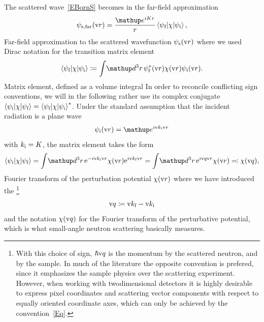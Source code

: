 The scattered wave~\cref{EBornS}
becomes in the far-field approximation
\begin{equation}\label{EsandwichC}
  \psi_\text{s,far}(\r)
  = \frac{\e^{iKr}}{r}
    \bra \psi_\tf|\chi|\psi_\ti\ket,
\end{equation}
  {Far-field approximation to the scattered wavefunction $\psi_\text{s}(\text{v}{r})$}%
where we used Dirac notation for the transition matrix element
%
\begin{equation}\label{Etrama}
  \bra \psi_\tf|\chi|\psi_\ti\ket
  \coloneqq  \int\!\d^3r\, \psi^*_\tf(\r)\chi(\r)\psi_\ti(\r).
\end{equation}
\nomenclature[0$\langle$0]{{$\bra\ldots\vert\ldots\vert\ldots\ket$}}
  {Matrix element, defined as a volume integral}%
In order to reconcile conflicting sign conventions,
we will in the following rather use its complex conjugate
$\left\langle \psi_{\text{i}}|\chi|\psi_{\text{f}}\right\rangle = \left\langle \psi_{\text{f}}|\chi|\psi_{\text{i}}\right\rangle^*$.
Under the standard assumption
that the incident radiation is a plane wave
\begin{equation}\label{EPsi0Plane}
  \psi_\ti(\r)=\e^{i \k_\ti \r}
\end{equation}
with $k_{\text{i}}=K$,
the matrix element takes the form
\begin{equation}\label{Echiq}
  \bra \psi_\ti|\chi|\psi_\tf\ket
  = \int\!\d^3r\, {\rm e}^{-i\k_\ti\r}\chi(\r){\rm e}^{i\k_\tf\r}
  = \int\!\d^3r\, {\rm e}^{i\q\r}\chi(\r)
  \eqqcolon \chi(\q),
\end{equation}
  {Fourier transform of the perturbation potential $\chi(\text{v}{r})$}%
where we have introduced the \footnote
{With this choice of sign,
%
$\hbar\text{v}{q}$ is the momentum
%
 by the scattered neutron,
and  by the sample.
In much of the literature the opposite convention is prefered,
since it emphasizes the sample physics over the scattering experiment.
However, when working with twodimensional detectors
it is highly desirable to express pixel coordinates
and scattering vector components
with respect to equally oriented coordinate axes,
which can only be achieved by the convention~\cref{Eq}.}
%
\begin{equation}\label{Eq}
  \text{v}{q}\coloneqq \text{v}{k}_{\text{f}}-\text{v}{k}_{\text{i}}
\end{equation}
%
and the notation $\chi(\text{v}{q})$ for
the Fourier transform of the perturbative potential,
%
which is what small-angle neutron scattering basically measures.

